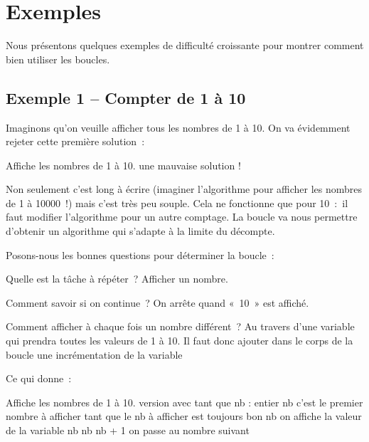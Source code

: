 \section{Exemples}

	Nous présentons quelques exemples de difficulté
	croissante pour montrer comment bien utiliser les boucles.

	\subsection{Exemple 1 -- Compter de 1 à 10}

		Imaginons qu’on veuille afficher tous les nombres de 1 à 10. 
		On va évidemment rejeter cette première solution~:

		\begin{Pseudocode}
		\LComment Affiche les nombres de 1 à 10.
		 \RComment une mauvaise solution !
		\EndModule
		\end{Pseudocode}

		Non seulement c’est long à écrire 
		(imaginer l’algorithme pour afficher les nombres de 1 à 10000~!) 
		mais c’est très peu souple.
		Cela ne fonctionne que pour 10~:~il faut modifier l’algorithme pour
		un autre comptage. La boucle va nous permettre
		d’obtenir un algorithme qui s’adapte
		à la limite du décompte.

		Posons-nous les bonnes questions pour déterminer la boucle~:

		\begin{liste}
		\item 
			Quelle est la tâche à répéter~? Afficher un nombre.
		\item 
			Comment savoir si on continue~? On arrête quand «~10~» est affiché.
		\item 
			Comment afficher à chaque fois un nombre différent~? 
			Au travers d’une variable qui prendra toutes les valeurs de 1 à 10. 
			Il faut donc ajouter dans le corps de la
			boucle une incrémentation de la variable
		\end{liste}

		Ce qui donne~:

		\begin{Pseudocode}
		\LComment Affiche les nombres de 1 à 10.
		 \RComment version avec tant que
			\Decl nb : entier
			\Let nb  \RComment c’est le premier nombre à afficher
			 \RComment tant que le nb à afficher est toujours bon
				\Write nb \RComment on affiche la valeur de la variable nb
				\Let nb \Gets nb + 1 \RComment on passe au nombre suivant
			\EndWhile
		\EndModule
		\end{Pseudocode}

